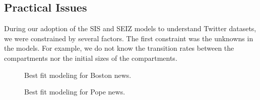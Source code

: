 \subsection{Practical Issues}
During our adoption of the SIS and SEIZ models to understand Twitter datasets, we were constrained by several factors. The first constraint was the unknowns in the models. For example, we do not know the transition rates between the compartments nor the initial sizes of the compartments.


\begin{figure}[t]
\centering
{}
\vspace{-1em}
\caption{Best fit modeling for Boston news.}
\label{fig:Boston_bombing}
\end{figure}


\begin{figure}[t]
\centering
{}
\vspace{-1em}
\caption{Best fit modeling for Pope news.
\label{fig:Benedict}
}
\end{figure}


